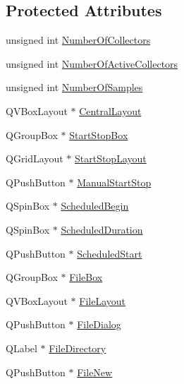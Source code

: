 \subsection*{Protected Attributes}
\begin{DoxyCompactItemize}
\item 
unsigned int \hyperlink{classmts_collector_qt_widget_a279a3e42bf7a0e6839ee158fc93f7d11}{Number\+Of\+Collectors}
\item 
unsigned int \hyperlink{classmts_collector_qt_widget_a69a07e5364bc6b04865cc02f241f3dab}{Number\+Of\+Active\+Collectors}
\item 
unsigned int \hyperlink{classmts_collector_qt_widget_aec5112d28fd52db2a8a4cc141ffe66d0}{Number\+Of\+Samples}
\item 
Q\+V\+Box\+Layout $\ast$ \hyperlink{classmts_collector_qt_widget_a68704bf96828912bf60f4da1b2e4b21c}{Central\+Layout}
\item 
Q\+Group\+Box $\ast$ \hyperlink{classmts_collector_qt_widget_a9e0eccd6ea10c9446fbab9f1f721afc9}{Start\+Stop\+Box}
\item 
Q\+Grid\+Layout $\ast$ \hyperlink{classmts_collector_qt_widget_aee8a4e84213a4cbf7655b897c2913e75}{Start\+Stop\+Layout}
\item 
Q\+Push\+Button $\ast$ \hyperlink{classmts_collector_qt_widget_a6cf96a9aa4904185c960c8dc9a34ec77}{Manual\+Start\+Stop}
\item 
Q\+Spin\+Box $\ast$ \hyperlink{classmts_collector_qt_widget_a2ad2123d97d626a84a66634928c92e7f}{Scheduled\+Begin}
\item 
Q\+Spin\+Box $\ast$ \hyperlink{classmts_collector_qt_widget_a59b20c153b54016d10f950e44224290f}{Scheduled\+Duration}
\item 
Q\+Push\+Button $\ast$ \hyperlink{classmts_collector_qt_widget_ae7cef6bafd7aa1f4fcd06490a49d255e}{Scheduled\+Start}
\item 
Q\+Group\+Box $\ast$ \hyperlink{classmts_collector_qt_widget_a827f8b0d880b6425a417dacca2eb656b}{File\+Box}
\item 
Q\+V\+Box\+Layout $\ast$ \hyperlink{classmts_collector_qt_widget_acaafed83888553de79580c2e352f5def}{File\+Layout}
\item 
Q\+Push\+Button $\ast$ \hyperlink{classmts_collector_qt_widget_a7a8e39a5afad4d819164f7db40722e41}{File\+Dialog}
\item 
Q\+Label $\ast$ \hyperlink{classmts_collector_qt_widget_a31c1ee375fd6a31bc44dfc86d266a352}{File\+Directory}
\item 
Q\+Push\+Button $\ast$ \hyperlink{classmts_collector_qt_widget_a7dc4b786d47df9f772085870f413125a}{File\+New}

\end{DoxyCompactItemize}
